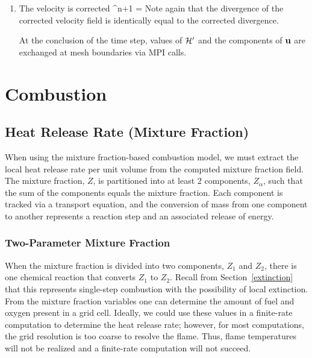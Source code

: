 \documentclass[11pt]{book}
\begin{document}
\begin{enumerate}
\item The velocity is corrected
\be
\bu^{n+1} = \ha {}
\ee
Note again that the divergence of the corrected velocity field is identically equal to the corrected divergence.

At the conclusion of the time step, values of $\cal H'$ and the components of ${\bf u}$ are exchanged at mesh boundaries via MPI calls.

\end{enumerate}



\clearpage
\section{Combustion}

\subsection{Heat Release Rate (Mixture Fraction)}


When using the mixture fraction-based combustion model, we must extract the local heat release rate per unit
volume from the computed mixture
fraction field. The mixture fraction, $Z$, is partitioned into at least 2 components, $Z_\alpha$, such that the
sum of the components equals the mixture
fraction. Each component is tracked via a transport equation, and the conversion of mass from one
component to another represents a reaction step and an associated release of energy.


\subsubsection{Two-Parameter Mixture Fraction}

When the mixture fraction is divided into two components, $Z_1$ and $Z_2$, there is one chemical
reaction that converts $Z_1$ to $Z_2$.  Recall from Section~\ref{extinction}
that this represents single-step combustion with the possibility of local extinction.  From the mixture fraction
variables one can determine the amount of fuel and oxygen present in a grid cell.  Ideally, we could use these values
in a finite-rate computation to determine the heat release rate; however, for most computations, the
grid resolution is too coarse to resolve the flame.  Thus, flame temperatures will not be realized and a
finite-rate computation will not succeed.
\end{document}
